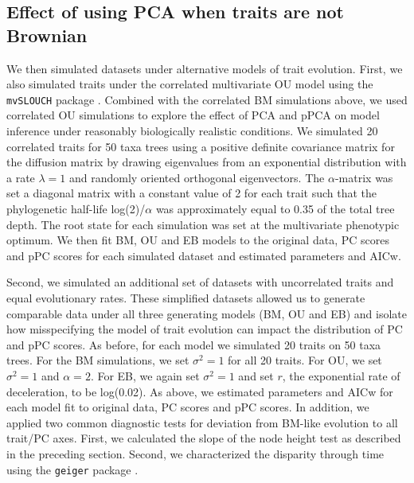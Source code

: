 \documentclass[a4paper,11pt]{article}
\begin{document}
\subsection{Effect of using PCA when traits are not Brownian}
We then simulated datasets under alternative models of trait evolution. First, we also simulated traits under the correlated multivariate OU model using the \texttt{mvSLOUCH} package \citep{Bartoszek2012}. Combined with the correlated BM simulations above, we used correlated OU simulations to explore the effect of PCA and pPCA on model inference under reasonably biologically realistic conditions. We simulated 20 correlated traits for 50 taxa trees using a positive definite covariance matrix for the diffusion matrix by drawing eigenvalues from an exponential distribution with a rate $\lambda = \text{1}$ and randomly oriented orthogonal eigenvectors. The $\alpha$-matrix was set a diagonal matrix with a constant value of 2 for each trait such that the phylogenetic half-life log(2)/$\alpha$ \citep{Hansen2008} was approximately equal to 0.35 of the total tree depth. The root state for each simulation was set at the multivariate phenotypic optimum. We then fit BM, OU and EB models to the original data, PC scores and pPC scores for each simulated dataset and estimated parameters and AICw. 

Second, we simulated an additional set of datasets with uncorrelated traits and equal evolutionary rates. These simplified datasets allowed us to generate comparable data under all three generating models (BM, OU and EB) and isolate how misspecifying the model of trait evolution can impact the distribution of PC and pPC scores. As before, for each model we simulated 20 traits on 50 taxa trees. For the BM simulations, we set $\sigma^2=\text{1}$ for all 20 traits. For OU, we set $\sigma^2=\text{1}$ and $\alpha=\text{2}$. For EB, we again set $\sigma^2=\text{1}$ and set $r$, the exponential rate of deceleration, to be log(0.02). As above, we estimated parameters and AICw for each model fit to original data, PC scores and pPC scores. In addition, we applied two common diagnostic tests for deviation from BM-like evolution to all trait/PC axes. First, we calculated the slope of the node height test as described in the preceding section. Second, we characterized the disparity through time \citep{Harmon2003} using the \texttt{geiger} package \citep{geiger2}. 
\end{document}
